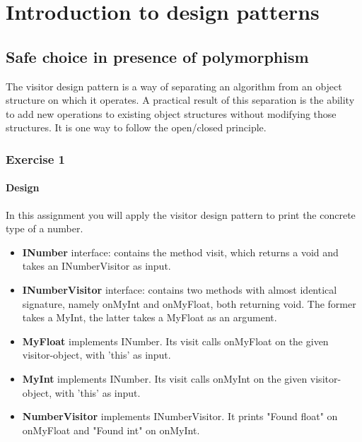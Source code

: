 \setcounter{part}{4}
\setcounter{chapter}{0}
\chapter{Introduction to design patterns}

\section{Safe choice in presence of polymorphism }
The visitor design pattern is a way of separating an algorithm from an object structure on which it operates.
A practical result of this separation is the ability to add new operations to existing object structures without modifying those structures.
It is one way to follow the open/closed principle.

    
\subsection{Exercise 1}
\subsubsection{Design}
In this assignment you will apply the visitor design pattern to print the concrete type of a number.

\begin{itemize}
\item \textbf{INumber} interface: contains the method visit, which returns a void and takes an INumberVisitor as input.
\item \textbf{INumberVisitor} interface: contains two methods with almost identical signature, namely onMyInt and onMyFloat, both returning void. The former takes a MyInt, the latter takes a MyFloat as an argument.
\item \textbf{MyFloat} implements INumber. Its visit calls onMyFloat on the given visitor-object, with 'this' as input.
\item \textbf{MyInt} implements INumber. Its visit calls onMyInt on the given visitor-object, with 'this' as input.
\item \textbf{NumberVisitor} implements INumberVisitor. It prints "Found float" on onMyFloat and "Found int" on onMyInt.
\end{itemize}
